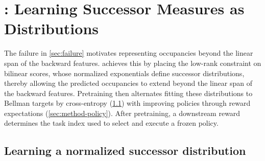 \section{\name{}: Learning Successor Measures as Distributions}
\label{sec:method}


The failure in \cref{sec:failure} motivates representing occupancies beyond the linear span of the backward features.
\name{} achieves this by placing the low-rank constraint on bilinear scores, whose normalized exponentials define successor distributions, thereby allowing the predicted occupancies to extend beyond the linear span of the backward features.
Pretraining then alternates fitting these distributions to Bellman targets by cross-entropy (\cref{sec:method-learning}) with improving policies through reward expectations (\cref{sec:method-policy}).
After pretraining, a downstream reward determines the task index used to select and execute a frozen policy.

\subsection{Learning a normalized successor distribution}
\label{sec:method-learning}


